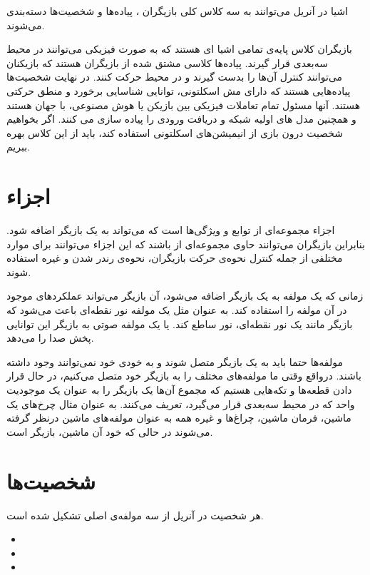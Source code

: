 اشیا در آنریل می‌توانند به سه کلاس کلی بازیگران
، پیاده‌ها 
و شخصیت‌ها
دسته‌بندی می‌شوند.

بازیگران کلاس پایه‌ی تمامی اشیا ای هستند که به صورت فیزیکی می‌توانند در محیط سه‌بعدی قرار گیرند.
پیاده‌ها کلاسی مشتق شده از بازیگران هستند که بازیکنان می‌توانند کنترل آن‌ها را بدست گیرند و 
در محیط حرکت کنند.
 در نهایت شخصیت‌ها پیاده‌هایی هستند که دارای مش اسکلتونی، توانایی شناسایی برخورد و منطق حرکتی هستند.
 آنها مسئول تمام تعاملات فیزیکی بین بازیکن یا هوش مصنوعی، با جهان هستند و همچنین مدل های اولیه شبکه و دریافت ورودی را پیاده سازی می کنند. 
اگر بخواهیم شخصیت درون بازی از انیمیشن‌های اسکلتونی استفاده کند، باید از این کلاس بهره ببریم.

\section{اجزاء}

اجزاء
مجموعه‌ای از توابع و ویژگی‌ها است که می‌تواند به یک بازیگر اضافه شود.
بنابراین بازیگران می‌توانند حاوی مجموعه‌ای از
باشند که این اجزاء می‌توانند برای موارد مختلفی از جمله
کنترل نحوه‌ی حرکت بازیگران، 
نحوه‌ی رندر شدن و غیره استفاده شوند.

زمانی که یک مولفه به یک بازیگر اضافه می‌شود، آن بازیگر می‌تواند عملکرد‌های موجود در آن مولفه را استفاده کند.
به عنوان مثل یک مولفه نور نقطه‌ای باعث می‌شود که بازیگر مانند یک نور نقطه‌ای، نور ساطع کند.
یا یک مولفه صوتی به بازیگر این توانایی پخش صدا را می‌دهد.

مولفه‌ها حتما باید به یک بازیگر متصل شوند و به خودی خود نمی‌توانند وجود داشته باشند.
درواقع وقتی ما مولفه‌های مختلف را به بازیگر خود متصل می‌کنیم، در حال قرار دادن قطعه‌ها و تکه‌هایی هستیم
 که مجموع آن‌ها یک بازیگر را به عنوان یک موجودیت واحد که در محیط سه‌بعدی قرار می‌گیرد، تعریف می‌کنند.
 به عنوان مثال چرخ‌های یک ماشین، فرمان ماشین، چراغ‌ها و غیره همه به عنوان
 مولفه‌های ماشین درنظر گرفته می‌شوند در حالی که خود آن ماشین، بازیگر است.

\section{شخصیت‌ها}

هر شخصیت در آنریل از سه مولفه‌ی اصلی تشکیل شده است.


\begin{itemize}
	\item {}
	\item {}
	\item {}
\end{itemize}


